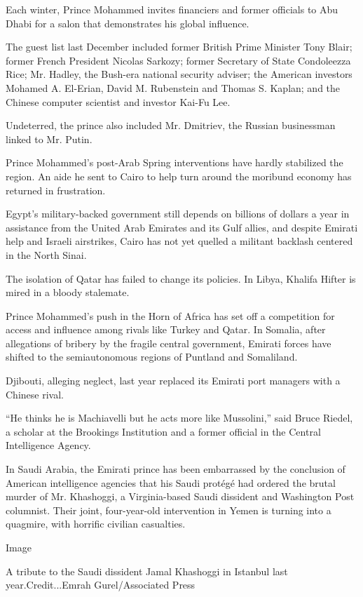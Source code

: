 Each winter, Prince Mohammed invites financiers and former officials to
Abu Dhabi for a salon that demonstrates his global influence.

The guest list last December included former British Prime Minister Tony
Blair; former French President Nicolas Sarkozy; former Secretary of
State Condoleezza Rice; Mr. Hadley, the Bush-era national security
adviser; the American investors Mohamed A. El-Erian, David M. Rubenstein
and Thomas S. Kaplan; and the Chinese computer scientist and investor
Kai-Fu Lee.

Undeterred, the prince also included Mr. Dmitriev, the Russian
businessman linked to Mr. Putin.

Prince Mohammed's post-Arab Spring interventions have hardly stabilized
the region. An aide he sent to Cairo to help turn around the moribund
economy has returned in frustration.

Egypt's military-backed government still depends on billions of dollars
a year in assistance from the United Arab Emirates and its Gulf allies,
and despite Emirati help and Israeli airstrikes, Cairo has not yet
quelled a militant backlash centered in the North Sinai.

The isolation of Qatar has failed to change its policies. In Libya,
Khalifa Hifter is mired in a bloody stalemate.

Prince Mohammed's push in the Horn of Africa has set off a competition
for access and influence among rivals like Turkey and Qatar. In Somalia,
after allegations of bribery by the fragile central government, Emirati
forces have shifted to the semiautonomous regions of Puntland and
Somaliland.

Djibouti, alleging neglect, last year replaced its Emirati port managers
with a Chinese rival.

``He thinks he is Machiavelli but he acts more like Mussolini,'' said
Bruce Riedel, a scholar at the Brookings Institution and a former
official in the Central Intelligence Agency.

In Saudi Arabia, the Emirati prince has been embarrassed by the
conclusion of American intelligence agencies that his Saudi protégé had
ordered the brutal murder of Mr. Khashoggi, a Virginia-based Saudi
dissident and Washington Post columnist. Their joint, four-year-old
intervention in Yemen is turning into a quagmire, with horrific civilian
casualties.

Image

A tribute to the Saudi dissident Jamal Khashoggi in Istanbul last
year.Credit...Emrah Gurel/Associated Press

